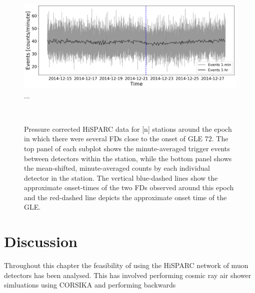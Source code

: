 \begin{figure}[ht]
	\centering
	\includegraphics[width=0.65\columnwidth]{FD_201412_501_Pcorr.png}
	\caption{...}
	\label{fig:FD_201412_501_Pcorr}
\end{figure}



\begin{figure}[ht]
	\centering
	 \\
	
	
	\caption{Pressure corrected HiSPARC data for [n] stations around the epoch in which there were several FDs close to the onset of GLE 72. The top panel of each subplot shows the minute-averaged trigger events between detectors within the station, while the bottom panel shows the mean-shifted, minute-averaged counts by each individual detector in the station. The vertical blue-dashed lines show the approximate onset-times of the two FDs observed around this epoch and the red-dashed line depicts the approximate onset time of the GLE.}
	\label{fig:FD_GLE72_Pcorr}
\end{figure}



\section{Discussion}\label{sec:HS_discussion}

Throughout this chapter the feasibility of using the HiSPARC network of muon detectors has been analysed. This has involved performing cosmic ray air shower simluations using CORSIKA and performing backwards